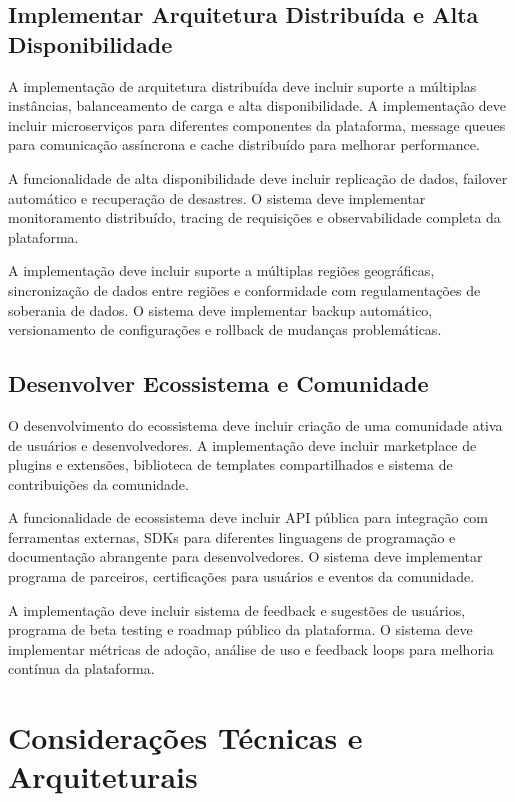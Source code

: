 \documentclass[12pt,a4paper]{article}
\begin{document}
\subsection{Implementar Arquitetura Distribuída e Alta Disponibilidade}

A implementação de arquitetura distribuída deve incluir suporte a múltiplas instâncias, balanceamento de carga e alta disponibilidade. A implementação deve incluir microserviços para diferentes componentes da plataforma, message queues para comunicação assíncrona e cache distribuído para melhorar performance.

A funcionalidade de alta disponibilidade deve incluir replicação de dados, failover automático e recuperação de desastres. O sistema deve implementar monitoramento distribuído, tracing de requisições e observabilidade completa da plataforma.

A implementação deve incluir suporte a múltiplas regiões geográficas, sincronização de dados entre regiões e conformidade com regulamentações de soberania de dados. O sistema deve implementar backup automático, versionamento de configurações e rollback de mudanças problemáticas.

\subsection{Desenvolver Ecossistema e Comunidade}

O desenvolvimento do ecossistema deve incluir criação de uma comunidade ativa de usuários e desenvolvedores. A implementação deve incluir marketplace de plugins e extensões, biblioteca de templates compartilhados e sistema de contribuições da comunidade.

A funcionalidade de ecossistema deve incluir API pública para integração com ferramentas externas, SDKs para diferentes linguagens de programação e documentação abrangente para desenvolvedores. O sistema deve implementar programa de parceiros, certificações para usuários e eventos da comunidade.

A implementação deve incluir sistema de feedback e sugestões de usuários, programa de beta testing e roadmap público da plataforma. O sistema deve implementar métricas de adoção, análise de uso e feedback loops para melhoria contínua da plataforma.

\section{Considerações Técnicas e Arquiteturais}
\end{document}
